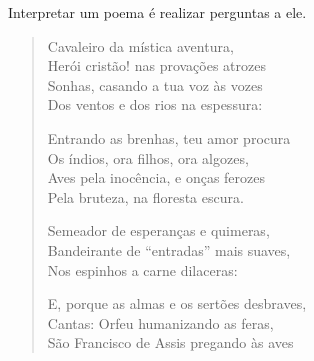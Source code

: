 Interpretar um poema é realizar perguntas a ele.

\begin{verse}
Cavaleiro da mística aventura, \\
Herói cristão! nas provações atrozes \\
Sonhas, casando a tua voz às vozes \\
Dos ventos e dos rios na espessura:

Entrando as brenhas, teu amor procura \\
Os índios, ora filhos, ora algozes, \\
Aves pela inocência, e onças ferozes \\
Pela bruteza, na floresta escura.

Semeador de esperanças e quimeras, \\
Bandeirante de “entradas” mais suaves, \\
Nos espinhos a carne dilaceras:

E, porque as almas e os sertões desbraves, \\
Cantas: Orfeu humanizando as feras, \\
São Francisco de Assis pregando às aves
\end{verse}

